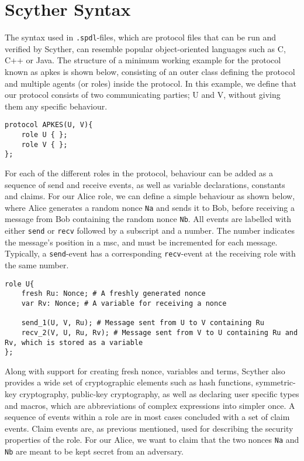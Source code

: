  
\section{Scyther Syntax}


The syntax used in \verb!.spdl!-files, which are protocol files that can be run and verified by Scyther, can resemble popular object-oriented languages such as C, C++ or Java. The structure of a minimum working example for the protocol known as \gls{apkes} is shown below, consisting of an outer class defining the protocol and multiple agents (or roles) inside the protocol. In this example, we define that our protocol consists of two communicating parties; U and V, without giving them any specific behaviour.

\begin{lstlisting}
protocol APKES(U, V){
	role U { };
	role V { };  
};
\end{lstlisting}


For each of the different roles in the protocol, behaviour can be added as a sequence of send and receive events, as well as variable declarations, constants and claims. For our Alice role, we can define a simple behaviour as shown below, where Alice generates a random nonce \texttt{Na} and sends it to Bob, before receiving a message from Bob containing the random nonce \texttt{Nb}. All events are labelled with either \texttt{send} or \texttt{recv} followed by a subscript and a number. The number indicates the message's position in a \gls{msc}, and must be incremented for each message. Typically, a \texttt{send}-event has a corresponding \texttt{recv}-event at the receiving role with the same number.


\begin{lstlisting}
role U{
	fresh Ru: Nonce; # A freshly generated nonce
	var Rv: Nonce; # A variable for receiving a nonce
	
	send_1(U, V, Ru); # Message sent from U to V containing Ru
	recv_2(V, U, Ru, Rv); # Message sent from V to U containing Ru and Rv, which is stored as a variable
};
\end{lstlisting}


Along with support for creating fresh nonce, variables and terms, Scyther also provides a wide set of cryptographic elements such as hash functions, symmetric-key cryptography, public-key cryptography, as well as declaring user specific types and macros, which are abbreviations of complex expressions into simpler once. A sequence of events within a role are in most cases concluded with a set of claim events. Claim events are, as previous mentioned, used for describing the security properties of the role. For our Alice, we want to claim that the two nonces \texttt{Na} and \texttt{Nb} are meant to be kept secret from an adversary.


